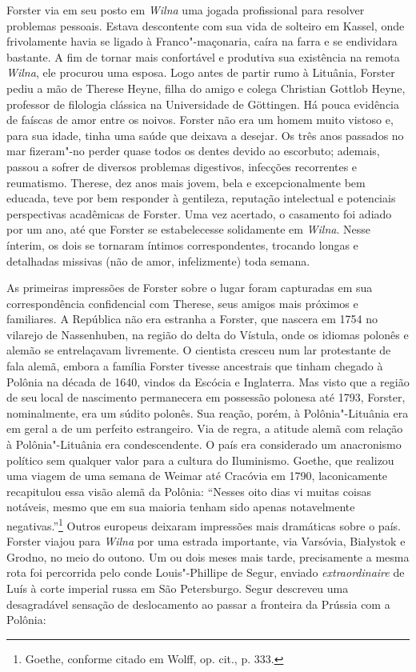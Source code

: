 Forster via em seu posto em \textit{Wilna} uma jogada profissional para resolver
problemas pessoais. Estava descontente com sua vida de solteiro em
Kassel, onde frivolamente havia se ligado à Franco"-maçonaria, caíra na
farra e se endividara bastante. A fim de tornar mais confortável e
produtiva sua existência na remota \textit{Wilna}, ele procurou uma esposa. Logo
antes de partir rumo à Lituânia, Forster pediu a mão de Therese Heyne,
filha do amigo e colega Christian Gottlob Heyne, professor de filologia
clássica na Universidade de Göttingen. Há pouca evidência de faíscas de
amor entre os noivos. Forster não era um homem muito vistoso e, para sua
idade, tinha uma saúde que deixava a desejar. Os três anos passados no
mar fizeram"-no perder quase todos os dentes devido ao escorbuto;
ademais, passou a sofrer de diversos problemas digestivos, infecções
recorrentes e reumatismo. Therese, dez anos mais jovem, bela e
excepcionalmente bem educada, teve por bem responder à gentileza,
reputação intelectual e potenciais perspectivas acadêmicas de Forster.
Uma vez acertado, o casamento foi adiado por um ano, até que Forster se
estabelecesse solidamente em \textit{Wilna}. Nesse ínterim, os dois se tornaram
íntimos correspondentes, trocando longas e detalhadas missivas (não de
amor, infelizmente) toda semana.

As primeiras impressões de Forster sobre o lugar foram capturadas em sua
correspondência confidencial com Therese, seus amigos mais próximos e
familiares. A República não era estranha a Forster, que nascera em 1754
no vilarejo de Nassenhuben, na região do delta do Vístula, onde os
idiomas polonês e alemão se entrelaçavam livremente. O cientista cresceu
num lar protestante de fala alemã, embora a família Forster tivesse
ancestrais que tinham chegado à Polônia na década de 1640, vindos da
Escócia e Inglaterra. Mas visto que a região de seu local de nascimento
permanecera em possessão polonesa até 1793, Forster, nominalmente, era
um súdito polonês. Sua reação, porém, à Polônia"-Lituânia era em geral a
de um perfeito estrangeiro. Via de regra, a atitude alemã com relação à
Polônia"-Lituânia era condescendente. O país era considerado um
anacronismo político sem qualquer valor para a cultura do Iluminismo.
Goethe, que realizou uma viagem de uma semana de Weimar até Cracóvia em
1790, laconicamente recapitulou essa visão alemã da Polônia: ``Nesses
oito dias vi muitas coisas notáveis, mesmo que em sua maioria tenham
sido apenas notavelmente negativas.''\footnote{Goethe, conforme citado em Wolff, op. cit., p. 333.}
Outros europeus deixaram impressões mais dramáticas sobre o país.
Forster viajou para \textit{Wilna} por uma estrada importante, via Varsóvia,
Białystok e Grodno, no meio do outono. Um ou dois meses mais tarde,
precisamente a mesma rota foi percorrida pelo conde Louis"-Phillipe de
Segur, enviado \textit{extraordinaire} de Luís  à corte imperial russa
em São Petersburgo. Segur descreveu uma desagradável sensação de
deslocamento ao passar a fronteira da Prússia com a Polônia:

